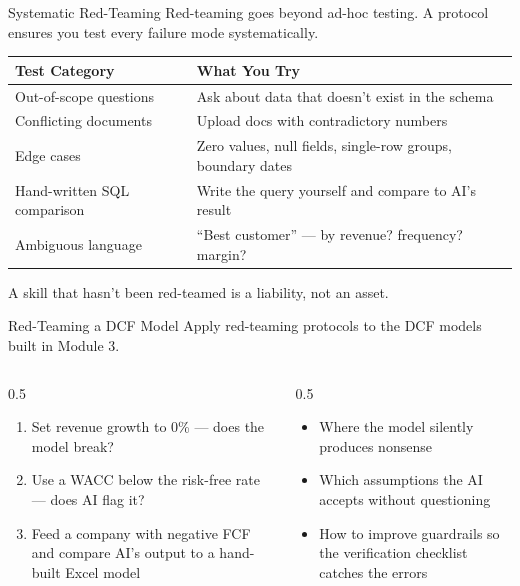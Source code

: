 \documentclass[aspectratio=169]{beamer}
\begin{document}
\begin{frame}{Systematic Red-Teaming}
Red-teaming goes beyond ad-hoc testing.  A \alert{protocol} ensures you test every failure mode systematically.
\vspace{0.3cm}
\begin{center}\small
\begin{tabular}{@{} l l @{}}
\toprule
\textbf{Test Category} & \textbf{What You Try} \\
\midrule
Out-of-scope questions & Ask about data that doesn't exist in the schema \\
Conflicting documents & Upload docs with contradictory numbers \\
Edge cases & Zero values, null fields, single-row groups, boundary dates \\
Hand-written SQL comparison & Write the query yourself and compare to AI's result \\
Ambiguous language & ``Best customer'' --- by revenue? frequency? margin? \\
\bottomrule
\end{tabular}
\end{center}
\vspace{0.3cm}
\alert{A skill that hasn't been red-teamed is a liability, not an asset.}
\end{frame}

\begin{frame}[shrink=5]{Red-Teaming a DCF Model}
Apply red-teaming protocols to the DCF models built in Module 3.
\vspace{0.2cm}
\begin{columns}[T]
\begin{column}{0.5\textwidth}
\begin{shadedbox}[title=\textbf{Financial Red-Team Tests}]
\begin{enumerate}\small
  \item Set revenue growth to 0\% --- does the model break?
  \item Use a WACC below the risk-free rate --- does AI flag it?
  \item Feed a company with negative FCF and compare AI's output to a hand-built Excel model
\end{enumerate}
\end{shadedbox}
\end{column}
\begin{column}{0.5\textwidth}
\begin{shadedbox}[title=\textbf{What You Learn}]
\begin{itemize}\small
  \item Where the model silently produces nonsense
  \item Which assumptions the AI accepts without questioning
  \item How to improve guardrails so the verification checklist catches the errors
\end{itemize}
\end{shadedbox}
\end{column}
\end{columns}
\end{frame}
\end{document}
